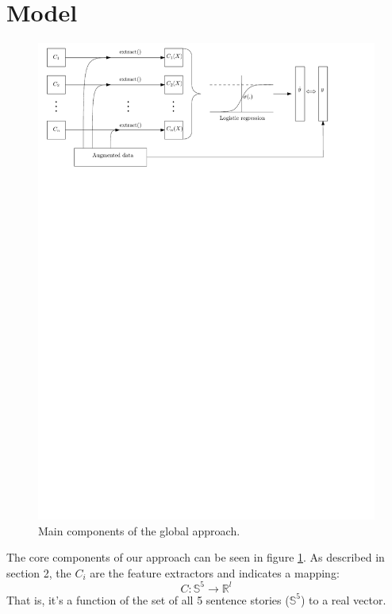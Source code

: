 \documentclass{article}
\begin{document}
\section{Model}

	\begin{figure}[h!]
		\centering
		\includegraphics[scale=0.8]{fig/logistic_fitting.pdf}
		\caption{Main components of the global approach.}
		\label{Main}
	\end{figure}

The core components of our approach can be seen in figure \ref*{Main}. As described in section 2, the $C_i$ are the feature extractors and indicates a mapping:
\begin{equation}
C: \mathbb{S}^5 \rightarrow \mathbb{R}^l
\end{equation}
That is, it's a function of the set of all 5 sentence stories ($\mathbb{S}^5$) to a real vector. 
\end{document}
